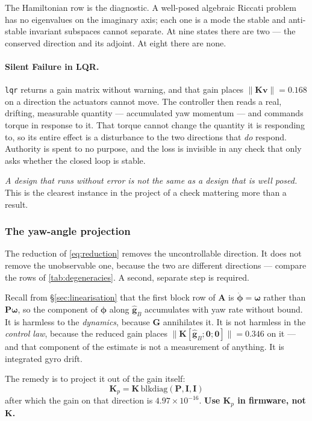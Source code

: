 The Hamiltonian row is the diagnostic. A well-posed algebraic Riccati problem
has no eigenvalues on the imaginary axis; each one is a mode the stable and
anti-stable invariant subspaces cannot separate. At nine states there are two
--- the conserved direction and its adjoint. At eight there are none.

\paragraph{Silent Failure in LQR.} \texttt{lqr} returns a gain matrix
without warning, and that gain places $\lVert\bm{K}\bm{v}\rVert = 0.168$ on a
direction the actuators cannot move. The controller then reads a real,
drifting, measurable quantity --- accumulated yaw momentum --- and commands
torque in response to it. That torque cannot change the quantity it is
responding to, so its entire effect is a disturbance to the two directions
that \emph{do} respond. Authority is spent to no purpose, and the loss is
invisible in any check that only asks whether the closed loop is stable.

\emph{A design that runs without error is not the same as a design that is
well posed.} This is the clearest instance in the project of a check
mattering more than a result.

\subsubsection{The yaw-angle projection}
\label{sec:projection}

The reduction of \eqref{eq:reduction} removes the uncontrollable direction.
It does not remove the unobservable one, because the two are different
directions --- compare the rows of \cref{tab:degeneracies}. A second,
separate step is required.

Recall from \S\ref{sec:linearisation} that the first block row of $\bm{A}$ is
$\dot{\bm{\phi}} = \bm{\omega}$ rather than $\bm{P}\bm{\omega}$, so the
component of $\bm{\phi}$ along $\hat{\bm{g}}_B$ accumulates with yaw rate
without bound. It is harmless to the \emph{dynamics}, because $\bm{G}$
annihilates it. It is not harmless in the \emph{control law}, because the
reduced gain places $\lVert\bm{K}[\hat{\bm{g}}_B;\bm{0};\bm{0}]\rVert =
0.346$ on it --- and that component of the estimate is not a measurement of
anything. It is integrated gyro drift.

The remedy is to project it out of the gain itself:
%
\begin{equation}
  \boxed{\;\bm{K}_p = \bm{K}\,\mathrm{blkdiag}(\bm{P},\bm{I},\bm{I})\;}
  \label{eq:Kp}
\end{equation}
%
after which the gain on that direction is $4.97\times10^{-16}$. \textbf{Use
$\bm{K}_p$ in firmware, not $\bm{K}$.}

